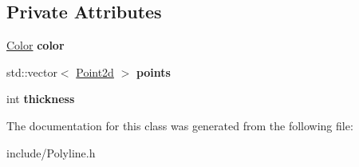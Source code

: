 \subsection*{Private Attributes}
\begin{DoxyCompactItemize}
\item 
\mbox{\label{classtiara_1_1Polyline_ae1d85ab179fae966af1986f51ac701b4}} 
\mbox{\hyperlink{classtiara_1_1Color}{Color}} {\bfseries color}
\item 
\mbox{\label{classtiara_1_1Polyline_a84f79f2080638da2782842e282bfd57e}} 
std\+::vector$<$ \mbox{\hyperlink{classtiara_1_1Point2d}{Point2d}} $>$ {\bfseries points}
\item 
\mbox{\label{classtiara_1_1Polyline_a4352c01fbc83bf10e542bb9a14d9c42d}} 
int {\bfseries thickness}
\end{DoxyCompactItemize}


The documentation for this class was generated from the following file\+:\begin{DoxyCompactItemize}
\item 
include/Polyline.\+h\end{DoxyCompactItemize}
